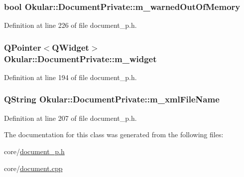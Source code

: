\hypertarget{classOkular_1_1DocumentPrivate_a0d88f3c05c3c5b7645c6a12fde948759}{
\subsubsection[{m\+\_\+warned\+Out\+Of\+Memory}]{\setlength{\rightskip}{0pt plus 5cm}bool Okular\+::\+Document\+Private\+::m\+\_\+warned\+Out\+Of\+Memory}}\label{classOkular_1_1DocumentPrivate_a0d88f3c05c3c5b7645c6a12fde948759}


Definition at line 226 of file document\+\_\+p.\+h.

\hypertarget{classOkular_1_1DocumentPrivate_a1cc02176f3cd9d24eb4f7968ef893de2}{
\subsubsection[{m\+\_\+widget}]{\setlength{\rightskip}{0pt plus 5cm}Q\+Pointer$<$Q\+Widget$>$ Okular\+::\+Document\+Private\+::m\+\_\+widget}}\label{classOkular_1_1DocumentPrivate_a1cc02176f3cd9d24eb4f7968ef893de2}


Definition at line 194 of file document\+\_\+p.\+h.

\hypertarget{classOkular_1_1DocumentPrivate_aae08e3c4d234247bf3d52608649e7c64}{
\subsubsection[{m\+\_\+xml\+File\+Name}]{\setlength{\rightskip}{0pt plus 5cm}Q\+String Okular\+::\+Document\+Private\+::m\+\_\+xml\+File\+Name}}\label{classOkular_1_1DocumentPrivate_aae08e3c4d234247bf3d52608649e7c64}


Definition at line 207 of file document\+\_\+p.\+h.



The documentation for this class was generated from the following files\+:\begin{DoxyCompactItemize}
\item 
core/\hyperlink{document__p_8h}{document\+\_\+p.\+h}\item 
core/\hyperlink{core_2document_8cpp}{document.\+cpp}\end{DoxyCompactItemize}
